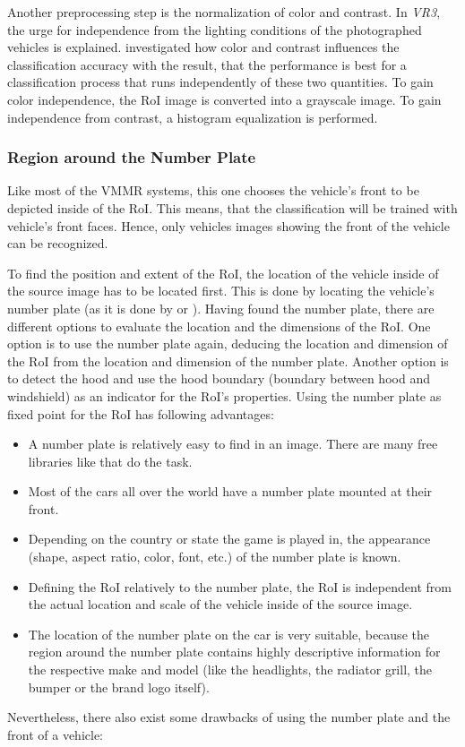 Another preprocessing step is the normalization of color and contrast. In \emph{VR3}, the urge for independence from the lighting conditions of the photographed vehicles is explained. \citeauthor{petrovic2004analysis} investigated how color and contrast influences the classification accuracy with the result, that the performance is best for a classification process that runs independently of these two quantities. To gain color independence, the RoI image is converted into a grayscale image. To gain independence from contrast, a histogram equalization is performed.

\subsubsection{Region around the Number Plate}\label{sec:regionAroundNumberPlate}
Like most of the VMMR systems, this one chooses the vehicle's front to be depicted inside of the RoI. This means, that the classification will be trained with vehicle's front faces. Hence, only vehicles images showing the front of the vehicle can be recognized.

To find the position and extent of the RoI, the location of the vehicle inside of the source image has to be located first. This is done by locating the vehicle's number plate (as it is done by \citep{petrovic2004analysis} or \citep{siddiqui2015robust}). Having found the number plate, there are different options to evaluate the location and the dimensions of the RoI. One option is to use the number plate again, deducing the location and dimension of the RoI from the location and dimension of the number plate. Another option is to detect the hood and use the hood boundary (boundary between hood and windshield) as an indicator for the RoI's properties. Using the number plate as fixed point for the RoI has following advantages:

\begin{itemize}
  \item A number plate is relatively easy to find in an image. There are many free libraries like \citep{OpenALPR} that do the task.
  \item Most of the cars all over the world have a number plate mounted at their front.
  \item Depending on the country or state the game is played in, the appearance (shape, aspect ratio, color, font, etc.) of the number plate is known.
  \item Defining the RoI relatively to the number plate, the RoI is independent from the actual location and scale of the vehicle inside of the source image.
  \item The location of the number plate on the car is very suitable, because the region around the number plate contains highly descriptive information for the respective make and model (like the headlights, the radiator grill, the bumper or the brand logo itself).
\end{itemize}
Nevertheless, there also exist some drawbacks of using the number plate and the front of a vehicle:

